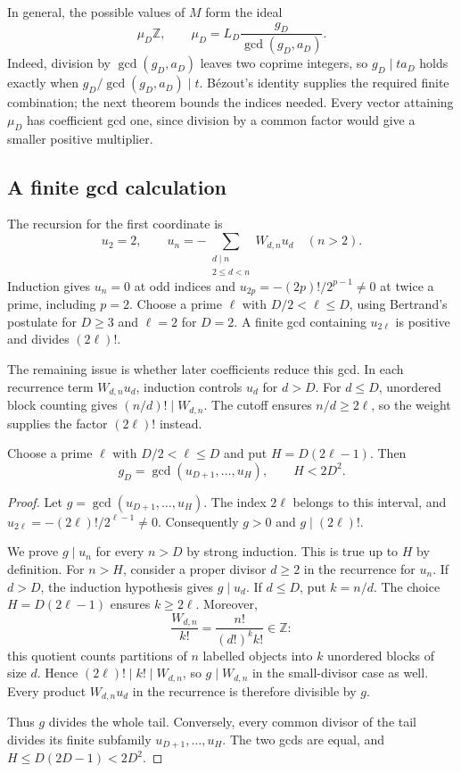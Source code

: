\documentclass[11pt]{article}
\begin{document}
In general, the possible values of $M$ form the ideal
\begin{equation}
 \mu_D\mathbb Z,\qquad
 \mu_D=L_D\frac{g_D}{\gcd(g_D,a_D)}.
 \label{eq:attainable-moment-ideal}
\end{equation}
Indeed, division by $\gcd(g_D,a_D)$ leaves two coprime integers, so
$g_D\mid ta_D$ holds exactly when $g_D/\gcd(g_D,a_D)\mid t$.
B\'ezout's identity supplies the required finite combination; the next
theorem bounds the indices needed. Every vector attaining $\mu_D$
has coefficient gcd one, since division by a common factor would give
a smaller positive multiplier.

\subsection{A finite gcd calculation}\label{sec:finite-gcd}

The recursion for the first coordinate is
\[
 u_2=2,\qquad
 u_n=-\sum_{\substack{d\mid n\\2\le d<n}}W_{d,n}u_d\quad(n>2).
\]
Induction gives $u_n=0$ at odd indices and
$u_{2p}=-(2p)!/2^{p-1}\ne0$ at twice a prime, including $p=2$.
Choose a prime $\ell$ with $D/2<\ell\le D$, using Bertrand's postulate
for $D\ge3$ and $\ell=2$ for $D=2$. A finite gcd containing $u_{2\ell}$
is positive and divides $(2\ell)!$.

The remaining issue is whether later coefficients reduce this gcd.
In each recurrence term $W_{d,n}u_d$, induction controls $u_d$ for
$d>D$. For $d\le D$, unordered block counting gives
$(n/d)!\mid W_{d,n}$. The cutoff ensures $n/d\ge2\ell$, so the weight
supplies the factor $(2\ell)!$ instead.

\begin{theorem}
\label{res:finite-channel-moment-certificate}
Choose a prime $\ell$ with $D/2<\ell\le D$ and put $H=D(2\ell-1)$.
Then
\[
g_D=\gcd(u_{D+1},\ldots,u_H),\qquad H<2D^2.
\]
\end{theorem}

\begin{proof}
Let $g=\gcd(u_{D+1},\ldots,u_H)$. The index $2\ell$ belongs to this
interval, and $u_{2\ell}=-(2\ell)!/2^{\ell-1}\ne0$. Consequently
$g>0$ and $g\mid(2\ell)!$.

We prove $g\mid u_n$ for every $n>D$ by strong induction. This is true
up to $H$ by definition. For $n>H$, consider a proper divisor $d\ge2$
in the recurrence for $u_n$. If $d>D$, the induction hypothesis gives
$g\mid u_d$. If $d\le D$, put $k=n/d$. The choice
$H=D(2\ell-1)$ ensures $k\ge2\ell$. Moreover,
\[
 \frac{W_{d,n}}{k!}=\frac{n!}{(d!)^k k!}\in\mathbb Z:
\]
this quotient counts partitions of $n$ labelled objects into $k$
unordered blocks of size $d$. Hence $(2\ell)!\mid k!\mid W_{d,n}$,
so $g\mid W_{d,n}$ in the small-divisor case as well.
Every product $W_{d,n}u_d$ in the recurrence is therefore divisible
by $g$.

Thus $g$ divides the whole tail. Conversely, every common divisor of
the tail divides its finite subfamily $u_{D+1},\ldots,u_H$. The two
gcds are equal, and $H\le D(2D-1)<2D^2$.
\end{proof}
\end{document}

